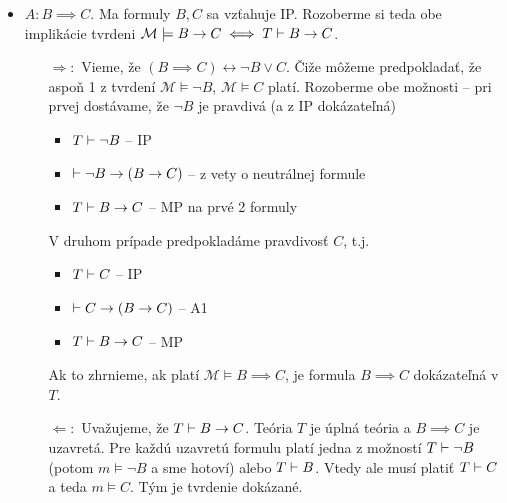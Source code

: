 \begin{dokaz}
\begin{itemize}
\begin{itemize}
        \item $A: B \implies C$. Ma formuly $B,C$ sa vzťahuje IP.
            Rozoberme si teda obe implikácie tvrdeni
            $\mathcal{M} \models B \rightarrow C \iff
             T \vdash B \rightarrow C$.
            \begin{itemize}
            \item[$\Rightarrow:$] Vieme, že $(B \implies C)
                    \leftrightarrow \neg B \lor C$. Čiže môžeme
                    predpokladať, že aspoň 1 z tvrdení 
                    $\mathcal{M} \models \neg B$,
                    $\mathcal{M} \models C$ platí. Rozoberme obe
                    možnosti -- pri prvej dostávame, že $\neg B$ je
                    pravdivá (a z IP dokázateľná)
                    \begin{itemize}
                    \item $T \vdash \neg B$ -- IP
                    \item $\vdash \neg B \rightarrow (B \rightarrow C)$ --
                        z vety o neutrálnej formule
                    \item $T \vdash B \rightarrow C$ -- MP na prvé 2
                        formuly
                    \end{itemize}
                    V druhom prípade predpokladáme pravdivosť $C$,
                    t.j.
                    \begin{itemize}
                    \item $T \vdash C$ -- IP
                    \item $\vdash C \rightarrow (B \rightarrow C)$ -- A1
                    \item $T \vdash B \rightarrow C$ -- MP
                    \end{itemize}
                    Ak to zhrnieme, ak platí
                    $\mathcal{M} \models B \implies C$, je formula
                    $B \implies C$ dokázateľná v $T$.

            \item[$\Leftarrow:$] Uvažujeme, že
                $T \vdash B \rightarrow C$.
                Teória $T$ je úplná teória a $B \implies C$ je uzavretá.
                Pre každú uzavretú formulu platí jedna z možností
                $T \vdash \neg B$ (potom $m \models \neg B$ a sme
                hotoví) alebo $T \vdash B$.
                Vtedy ale musí platiť $T \vdash C$
                a teda $m \models C$. Tým je tvrdenie dokázané.


\end{itemize}
\end{itemize}
\end{itemize}
\end{dokaz}

